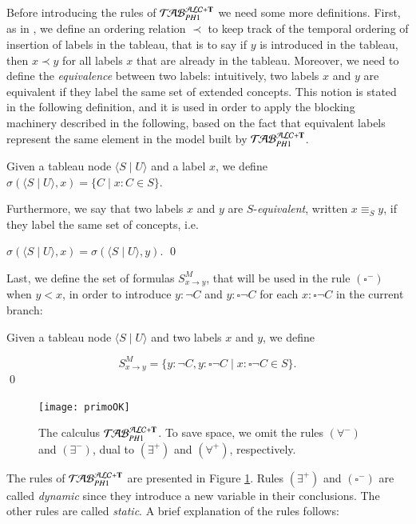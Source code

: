 \documentclass[a4paper, 11pt, oneside]{elsarticle}
\newcommand{\tip}{{\bf T}}
\newcommand{\nott} {\lnot}
\newcommand{\tc} {\mid}
\newcommand{\imp} {\rightarrow}
\newcommand{\bbox}{\square}
\newcommand{\sx} {\langle}
\newcommand{\dx} {\rangle}
\newcommand{\perogni} {\forall}
\newcommand{\esiste} {\exists}
\newcommand{\Gammam}[2]{S^{M}_{#1 \imp #2}}
\newcommand{\primo}{\mathrel{{\mathcal{T}\!\mathcal{AB}}}_{PH 1}^{\mathcal{ALC}+\mbox{\scriptsize $\tip$}}}
\newenvironment{definition}
{\begin{defi} \rm}{\qed \end{defi}}
\newcounter{posu}
\newtheorem{definition}[posu]{Definition}
\begin{document}
Before introducing the rules of $\primo$ we need some more definitions.
First, as in \cite{buchheit-et-al}, we define an ordering relation $\prec$ to keep track of the temporal ordering of insertion of labels in the tableau, that is to say if $y$ is introduced in the tableau, then $x \prec y$ for all labels $x$ that are already in the tableau.
Moreover, we need to define the \emph{equivalence} between two labels: intuitively, two labels $x$ and $y$ are equivalent if they label the same set of extended concepts.
This notion is stated in the following definition, and it is used in order to apply the blocking machinery described in the following, based on the fact that equivalent labels represent the same element in the model built by $\primo$.

\begin{definition}
Given a tableau node $\sx S \tc U \dx$ and a label $x$, we define
$\sigma(\sx S \tc U \dx,x)=\{C \tc x: C \in S\}.$

\noindent Furthermore, we say that two labels $x$ and $y$ are $S$-\emph{equivalent}, written $x \equiv_S y$, if they label the same set of concepts, i.e.

$\sigma(\sx S \tc U \dx,x)=\sigma(\sx S \tc U \dx,y).$
\end{definition}

\noindent Last, we define the set of formulas $\Gammam{x}{y}$, that will be used in the rule $(\bbox^-)$ when $y<x$, in order to introduce $y: \nott C$ and $y: \bbox \nott C$ for each $x: \bbox \nott C$ in the current branch:

\begin{definition}
Given a tableau node $\sx S \tc U \dx$ and two labels $x$ and $y$, we define

$$\Gammam{x}{y}=\{y: \nott C, y: \bbox \nott C \tc x: \bbox \nott C \in S\}.$$
\end{definition}


\begin{figure}[t]{
\centerline{
	\texttt{[image: primoOK]}
	}
}
\caption{The calculus $\primo$. To save space, we omit the rules $(\perogni^-)$ and $(\esiste^-)$, dual to $(\esiste^+)$ and $(\perogni^+)$, respectively.}
\label{immagine calcolo}
\end{figure}


\noindent The rules of $\primo$ are presented in Figure \ref{immagine calcolo}.
Rules $(\esiste^{+})$ and $(\bbox^{-})$ are called \emph{dynamic} since they introduce a new variable in their conclusions.
The other rules are called \emph{static}.
A brief explanation of the rules follows:
\end{document}
